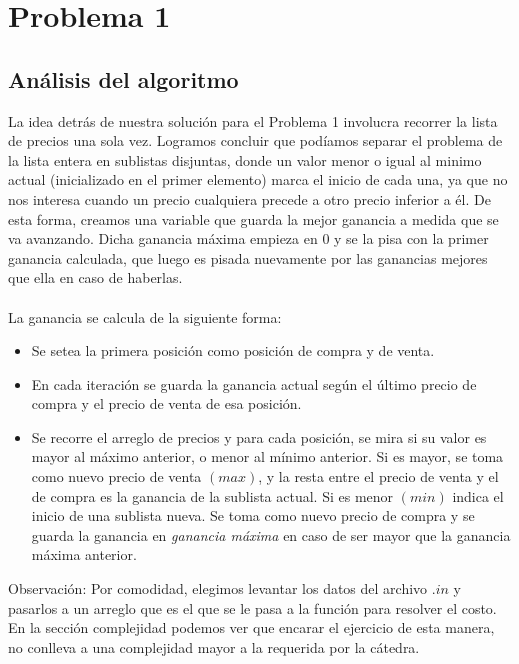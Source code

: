 \section{Problema 1}

\subsection{Análisis del algoritmo}

\indent La idea detrás de nuestra solución para el Problema 1 involucra recorrer
la lista de precios una sola vez. Logramos concluir que podíamos separar el
problema de la lista entera en sublistas disjuntas, donde un valor menor o igual
al minimo actual (inicializado en el primer elemento) marca el inicio de cada
una, ya que no nos interesa cuando un precio cualquiera precede a otro precio
inferior a él. De esta forma, creamos una variable que guarda la mejor ganancia
a medida que se va avanzando.
Dicha ganancia máxima empieza en 0 y se la pisa con la primer ganancia
calculada, que luego es pisada nuevamente por las ganancias mejores que ella en
caso de haberlas.\\
\\
\indent La ganancia se calcula de la siguiente forma:
\begin{itemize}
	\item Se setea la primera posición como posición de compra y de venta.
	\item En cada iteración se guarda la ganancia actual según el último
precio de compra y el precio de venta de esa posición.
	\item Se recorre el arreglo de precios y para cada posición, se mira si
su valor es mayor al máximo anterior, o menor al mínimo anterior.
Si es mayor, se toma como nuevo precio de venta $(max)$, y la resta entre el
precio de venta y el de compra es la ganancia de la sublista actual. Si es menor
$(min)$
indica el inicio de una sublista nueva. Se toma como nuevo precio de compra y se
guarda la ganancia en \textit{ganancia máxima} en caso de ser mayor que la
ganancia máxima anterior.
\end{itemize}

\indent Observación: Por comodidad, elegimos levantar los datos del archivo
$.in$
y pasarlos a un arreglo que es el que se le pasa a la función para resolver el
costo. En la sección complejidad podemos ver que encarar el ejercicio de esta
manera, no conlleva a una complejidad mayor a la requerida por la cátedra.\\


